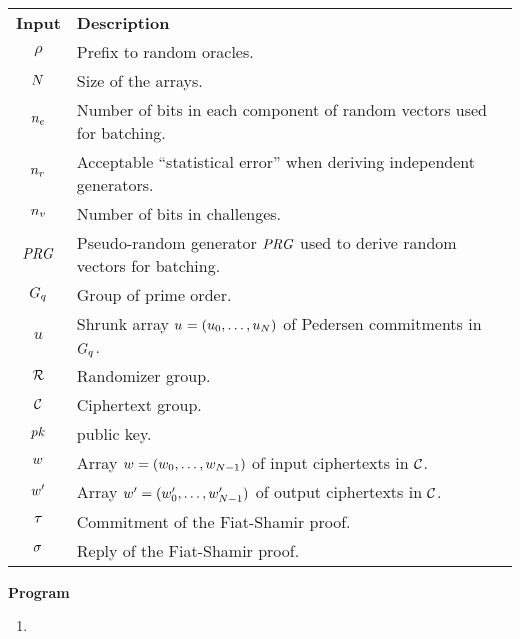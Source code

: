 \documentclass[11pt]{article}
\begin{document}
\begin{nicebox}
  \begin{algorithm}$\quad$\label{algo:ccpos}\\

    \vspace{-0.3cm}
    \hspace{-0.3cm}
    \begin{tabular}{cl}
      \textbf{Input} & \textbf{Description}\\
      $\rho$ & Prefix to random oracles.\\
      $N$ & Size of the arrays.\\
      ${n_e}$ & Number of bits in each component of random
      vectors used for batching.\\
      $n_r$ & Acceptable ``statistical error'' when deriving independent generators.\\      
      $n_v$ & Number of bits in challenges.\\
      $\mathit{PRG}$ & Pseudo-random generator $\mathit{PRG}$ used to derive random
      vectors for batching.\\
      $G_{q}$ & Group of prime order.\\ 
      $u$ & Shrunk array $u_{}=(u_{0},\ldots,u_{N})$ of Pedersen commitments in
      $G_{q}$.\\
      $\mathcal{R}$ & Randomizer group.\\
      $\mathcal{C}$ & Ciphertext group.\\
      $\mathit{pk}$ & \elgamal public key.\\ 
      $w_{}$ & Array $w_{}=(w_{0},\ldots,w_{N-1})$ of input ciphertexts in $\mathcal{C}$.\\
      $w_{}'$ & Array $w_{}'=(w_{0}',\ldots,w_{N-1}')$ of output ciphertexts in $\mathcal{C}$.\\
      $\tau_{}$ & Commitment of the Fiat-Shamir proof.\\
      $\sigma_{}$ & Reply of the Fiat-Shamir proof.
    \end{tabular}

    \vspace{0.2cm}
    \noindent
    \textbf{Program}

    \vspace{-0.3cm}
  \begin{enumerate}

  \item 
    \begin{enumerate}


\end{enumerate}
\end{enumerate}
\end{algorithm}
\end{nicebox}
\end{document}
